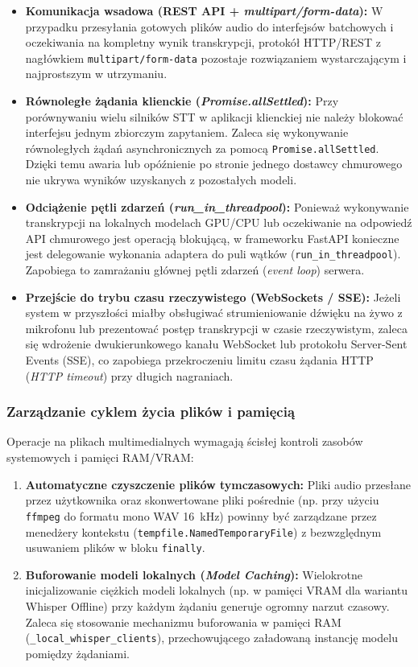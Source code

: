 \begin{itemize}
    \item \textbf{Komunikacja wsadowa (REST API + \textit{multipart/form-data}):} W przypadku przesyłania gotowych plików audio do interfejsów batchowych i oczekiwania na kompletny wynik transkrypcji, protokół HTTP/REST z nagłówkiem \texttt{multipart/form-data} pozostaje rozwiązaniem wystarczającym i najprostszym w utrzymaniu.
    \item \textbf{Równoległe żądania klienckie (\textit{Promise.allSettled}):} Przy porównywaniu wielu silników STT w aplikacji klienckiej nie należy blokować interfejsu jednym zbiorczym zapytaniem. Zaleca się wykonywanie równoległych żądań asynchronicznych za pomocą \texttt{Promise.allSettled}. Dzięki temu awaria lub opóźnienie po stronie jednego dostawcy chmurowego nie ukrywa wyników uzyskanych z pozostałych modeli.
    \item \textbf{Odciążenie pętli zdarzeń (\textit{run\_in\_threadpool}):} Ponieważ wykonywanie transkrypcji na lokalnych modelach GPU/CPU lub oczekiwanie na odpowiedź API chmurowego jest operacją blokującą, w frameworku FastAPI konieczne jest delegowanie wykonania adaptera do puli wątków (\texttt{run\_in\_threadpool}). Zapobiega to zamrażaniu głównej pętli zdarzeń (\textit{event loop}) serwera.
    \item \textbf{Przejście do trybu czasu rzeczywistego (WebSockets / SSE):} Jeżeli system w przyszłości miałby obsługiwać strumieniowanie dźwięku na żywo z mikrofonu lub prezentować postęp transkrypcji w czasie rzeczywistym, zaleca się wdrożenie dwukierunkowego kanału WebSocket lub protokołu Server-Sent Events (SSE), co zapobiega przekroczeniu limitu czasu żądania HTTP (\textit{HTTP timeout}) przy długich nagraniach.
\end{itemize}

\subsubsection{Zarządzanie cyklem życia plików i pamięcią}

Operacje na plikach multimedialnych wymagają ścisłej kontroli zasobów systemowych i pamięci RAM/VRAM:

\begin{enumerate}
    \item \textbf{Automatyczne czyszczenie plików tymczasowych:} Pliki audio przesłane przez użytkownika oraz skonwertowane pliki pośrednie (np. przy użyciu \texttt{ffmpeg} do formatu mono WAV 16~kHz) powinny być zarządzane przez menedżery kontekstu (\texttt{tempfile.NamedTemporaryFile}) z bezwzględnym usuwaniem plików w bloku \texttt{finally}.
    \item \textbf{Buforowanie modeli lokalnych (\textit{Model Caching}):} Wielokrotne inicjalizowanie ciężkich modeli lokalnych (np. w pamięci VRAM dla wariantu Whisper Offline) przy każdym żądaniu generuje ogromny narzut czasowy. Zaleca się stosowanie mechanizmu buforowania w pamięci RAM (\texttt{\_local\_whisper\_clients}), przechowującego załadowaną instancję modelu pomiędzy żądaniami.
\end{enumerate}

